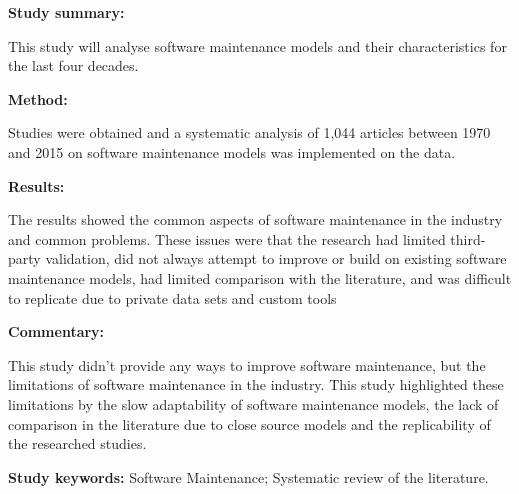 \begin{tcolorbox}[colback=gray!5!white, colframe=pastelgreen!40!black, title=Analyzing Forty Years of Software Maintenance Models\cite{Lenarduzzi2017}]
	\begin{minipage}[t]{0.25\textwidth}
		\textbf{Study summary:}
	\end{minipage}
	\hfill
	\begin{minipage}[t]{0.65\textwidth}
		This study will analyse software maintenance models and their characteristics for the last
four decades.
	\end{minipage}

	\vspace{0.75em} 

	\begin{minipage}[t]{0.25\textwidth}
		\textbf{Method:}
	\end{minipage}
	\hfill
	\begin{minipage}[t]{0.65\textwidth}
		Studies were obtained and a systematic analysis of 1,044 articles between 1970 and 2015 on software maintenance models was implemented on the data.
	\end{minipage}

	\vspace{0.75em} 

	\begin{minipage}[t]{0.25\textwidth}
		\textbf{Results:}
	\end{minipage}
	\hfill
	\begin{minipage}[t]{0.65\textwidth}
		The results showed the common aspects of software maintenance in the industry and common problems. These issues were that the research had limited third-party validation, did not always attempt to improve or build on existing software maintenance models, had limited comparison with the literature, and was difficult to replicate due to private data sets and custom tools
	\end{minipage}

	\vspace{0.75em} 

	\begin{minipage}[t]{0.25\textwidth}
		\textbf{Commentary:}
	\end{minipage}
	\hfill
	\begin{minipage}[t]{0.65\textwidth}
		This study didn't provide any ways to improve software maintenance, but the limitations of
software maintenance in the industry. This study highlighted these limitations by the slow adaptability of software maintenance models, the lack of comparison in the literature due to close
source models and the replicability of the researched studies.
	\end{minipage}
	\tcblower
	\textbf{Study keywords:} Software Maintenance; Systematic review of the literature.
\end{tcolorbox}

